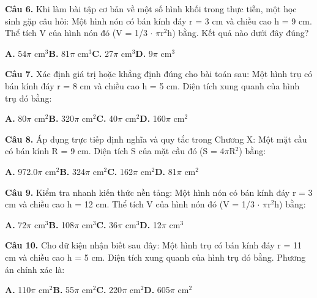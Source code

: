 \documentclass[11pt,a4paper]{article}
\begin{document}
\textbf{\color{primary} Câu 6.} Khi làm bài tập cơ bản về một số hình khối trong thực tiễn, một học sinh gặp câu hỏi: Một hình nón có bán kính đáy r = 3 cm và chiều cao h = 9 cm. Thể tích V của hình nón đó (V = 1/3 $\cdot$ $\pi$r$^2$h) bằng. Kết quả nào dưới đây đúng?\par
\hspace*{1.5em}\textbf{A.} 54$\pi$ cm$^3$\quad\quad \textbf{B.} 81$\pi$ cm$^3$\quad\quad \textbf{C.} 27$\pi$ cm$^3$\quad\quad \textbf{D.} 9$\pi$ cm$^3$\par\vspace{2pt}
\textbf{\color{primary} Câu 7.} Xác định giá trị hoặc khẳng định đúng cho bài toán sau: Một hình trụ có bán kính đáy r = 8 cm và chiều cao h = 5 cm. Diện tích xung quanh của hình trụ đó bằng:\par
\hspace*{1.5em}\textbf{A.} 80$\pi$ cm$^2$\quad\quad \textbf{B.} 320$\pi$ cm$^2$\quad\quad \textbf{C.} 40$\pi$ cm$^2$\quad\quad \textbf{D.} 160$\pi$ cm$^2$\par\vspace{2pt}
\textbf{\color{primary} Câu 8.} Áp dụng trực tiếp định nghĩa và quy tắc trong Chương X: Một mặt cầu có bán kính R = 9 cm. Diện tích S của mặt cầu đó (S = 4$\pi$R$^2$) bằng:\par
\hspace*{1.5em}\textbf{A.} 972.0$\pi$ cm$^2$\quad\quad \textbf{B.} 324$\pi$ cm$^2$\quad\quad \textbf{C.} 162$\pi$ cm$^2$\quad\quad \textbf{D.} 81$\pi$ cm$^2$\par\vspace{2pt}
\textbf{\color{primary} Câu 9.} Kiểm tra nhanh kiến thức nền tảng: Một hình nón có bán kính đáy r = 3 cm và chiều cao h = 12 cm. Thể tích V của hình nón đó (V = 1/3 $\cdot$ $\pi$r$^2$h) bằng:\par
\hspace*{1.5em}\textbf{A.} 72$\pi$ cm$^3$\quad\quad \textbf{B.} 108$\pi$ cm$^3$\quad\quad \textbf{C.} 36$\pi$ cm$^3$\quad\quad \textbf{D.} 12$\pi$ cm$^3$\par\vspace{2pt}
\textbf{\color{primary} Câu 10.} Cho dữ kiện nhận biết sau đây: Một hình trụ có bán kính đáy r = 11 cm và chiều cao h = 5 cm. Diện tích xung quanh của hình trụ đó bằng. Phương án chính xác là:\par
\hspace*{1.5em}\textbf{A.} 110$\pi$ cm$^2$\quad\quad \textbf{B.} 55$\pi$ cm$^2$\quad\quad \textbf{C.} 220$\pi$ cm$^2$\quad\quad \textbf{D.} 605$\pi$ cm$^2$\par\vspace{2pt}
\end{document}
